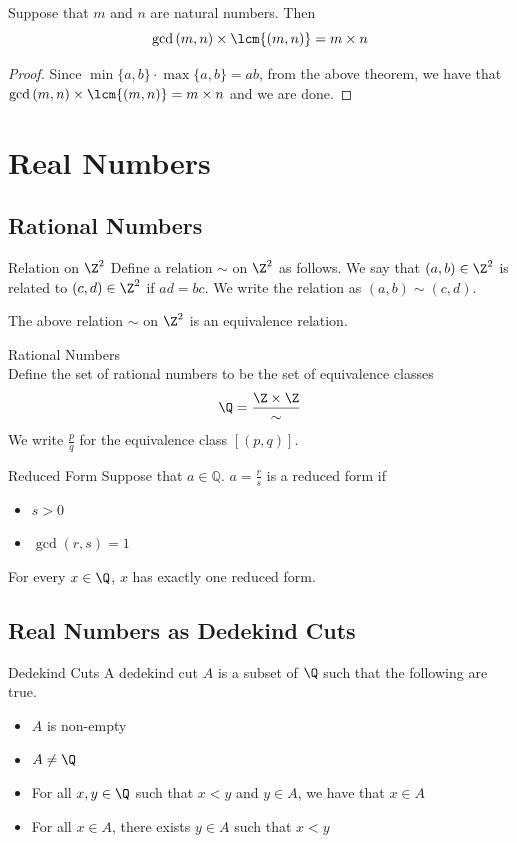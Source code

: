 \documentclass[a4paper]{article}
\begin{document}
\begin{prp}{}{} Suppose that $m$ and $n$ are natural numbers. Then $$\gcd{(m,n)}\times\lcm{(m,n)}=m\times n$$
\begin{proof} Since $\min\{a,b\}\cdot\max\{a,b\}=ab$, from the above theorem, we have that $\gcd{(m,n)}\times\lcm{(m,n)}=m\times n$ and we are done. 
\end{proof}
\end{prp}

\pagebreak
\section{Real Numbers}
\subsection{Rational Numbers}
\begin{defn}{Relation on $\Z^2$}{} Define a relation $\sim$ on $\Z^2$ as follows. We say that $(a,b)\in\Z^2$ is related to $(c,d)\in\Z^2$ if $ad=bc$. We write the relation as $(a,b)\sim(c,d)$. 
\end{defn}

\begin{lmm}{}{} The above relation $\sim$ on $\Z^2$ is an equivalence relation. 
\end{lmm}

\begin{defn}{Rational Numbers}{}\\
Define the set of rational numbers to be the set of equivalence classes $$\Q=\frac{\Z\times\Z}{\sim}$$ We write $\frac{p}{q}$ for the equivalence class $[(p,q)]$. 
\end{defn}

\begin{defn}{Reduced Form}{} Suppose that $a\in\mathbb{Q}$. $a=\frac{r}{s}$ is a reduced form if
\begin{itemize}
\item $s>0$
\item $\gcd{(r,s)}=1$
\end{itemize}
\end{defn}

\begin{prp}{}{} For every $x\in\Q$, $x$ has exactly one reduced form. 
\end{prp}

\subsection{Real Numbers as Dedekind Cuts}
\begin{defn}{Dedekind Cuts}{} A dedekind cut $A$ is a subset of $\Q$ such that the following are true. 
\begin{itemize}
\item $A$ is non-empty
\item $A\neq\Q$
\item For all $x,y\in\Q$ such that $x<y$ and $y\in A$, we have that $x\in A$
\item For all $x\in A$, there exists $y\in A$ such that $x<y$
\end{itemize}
\end{defn}
\end{document}
